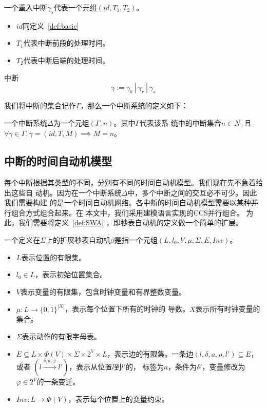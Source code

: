 \begin{definition}
	\label{def:segment}
	一个重入中断$\gamma_s$代表一个元组$(id, T_1, T_2)$。
	\begin{itemize}
		\item $id$同定义~\ref{def:basic}
		\item $T_1$代表中断前段的处理时间。
		\item $T_2$代表中断后端的处理时间。
	\end{itemize}
\end{definition}

\begin{definition}
	\label{def:intr}
	中断
	\begin{equation}
		\gamma := \gamma_b~|~\gamma_r~|~\gamma_s
	\end{equation}
\end{definition}

我们将中断的集合记作$\varGamma$，那么一个中断系统的定义如下：

\begin{definition}
	一个中断系统$\Delta$为一个元组$(\varGamma,n)$。其中$\varGamma$代表该系
	统中的中断集合$n\in N_+$且$\forall \gamma\in\varGamma, \gamma=(id, T, M)
	\implies M = n$。
\end{definition}

\subsection{中断的时间自动机模型}
\label{subsec:intr_automata}

每个中断根据其类型的不同，分别有不同的时间自动机模型。我们现在先不急着给出这些自
动机。因为在一个中断系统$\Delta$中，多个中断之间的交互必不可少。因此我们需要构建
的是一个时间自动机网络。各中断的时间自动机模型需要以某种并行组合方式组合起来。在
本文中，我们采用\uppaal 建模语言实现的CCS并行组合\cite{Bengtsson04timedautomata:}。
为此，我们需要将定义~\ref{def:SWA} ，即秒表自动机的定义做一个简单的扩展。

\begin{definition}
	\label{def:SWA_ext}
	一个定义在$\varSigma$上的扩展秒表自动机$\beta$是指一个元组$(L,l_0,V,\mu,
	\varSigma,E,Inv)$。
	\begin{itemize}
		\item $L$表示位置的有限集。
		\item $l_0\in L$，表示初始位置集合。
		\item $V$表示变量的有限集，包含时钟变量和有界整数变量。
		\item $\mu:L\longrightarrow \{0,1\}^{|X|}$，表示每个位置下所有的时钟的
		导数。$X$表示所有时钟变量的集合。
		\item $\varSigma$表示动作的有限字母表。
		\item $E\subseteq L\times \varPhi(V)\times \varSigma \times 2^V
		\times L$，表示边的有限集。一条边$(l,\delta,a,\rho,l')\subseteq E$，或者
		$(l\stackrel{\delta,a,\varphi}{\longrightarrow}l')$，表示从位置$l$到$l'$的，
		标签为$a$，条件为$\delta'$，变量修改为$\varphi \in 2^V$的一条变迁。
		\item $Inv:L\longrightarrow \varPhi(V)$，表示每个位置上的变量约束。
	\end{itemize}
\end{definition}

